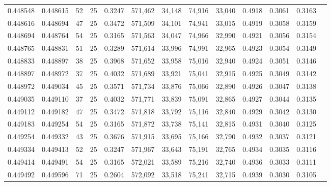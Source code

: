 \begin{tabular}{rrrrrrrrrrrrr}
0.448548 & 0.448615 &    52 &  25 &                                     0.3247 & 571,462 &  34,148 &  74,916 &  33,040 & 0.4918 & 0.3061 & 0.3163 \\
0.448616 & 0.448694 &    47 &  25 &                                     0.3472 & 571,509 &  34,101 &  74,941 &  33,015 & 0.4919 & 0.3058 & 0.3159 \\
0.448694 & 0.448764 &    54 &  25 &                                     0.3165 & 571,563 &  34,047 &  74,966 &  32,990 & 0.4921 & 0.3056 & 0.3154 \\
0.448765 & 0.448831 &    51 &  25 &                                     0.3289 & 571,614 &  33,996 &  74,991 &  32,965 & 0.4923 & 0.3054 & 0.3149 \\
0.448833 & 0.448897 &    38 &  25 &                                     0.3968 & 571,652 &  33,958 &  75,016 &  32,940 & 0.4924 & 0.3051 & 0.3146 \\
0.448897 & 0.448972 &    37 &  25 &                                     0.4032 & 571,689 &  33,921 &  75,041 &  32,915 & 0.4925 & 0.3049 & 0.3142 \\
0.448972 & 0.449034 &    45 &  25 &                                     0.3571 & 571,734 &  33,876 &  75,066 &  32,890 & 0.4926 & 0.3047 & 0.3138 \\
0.449035 & 0.449110 &    37 &  25 &                                     0.4032 & 571,771 &  33,839 &  75,091 &  32,865 & 0.4927 & 0.3044 & 0.3135 \\
0.449112 & 0.449182 &    47 &  25 &                                     0.3472 & 571,818 &  33,792 &  75,116 &  32,840 & 0.4929 & 0.3042 & 0.3130 \\
0.449183 & 0.449254 &    54 &  25 &                                     0.3165 & 571,872 &  33,738 &  75,141 &  32,815 & 0.4931 & 0.3040 & 0.3125 \\
0.449254 & 0.449332 &    43 &  25 &                                     0.3676 & 571,915 &  33,695 &  75,166 &  32,790 & 0.4932 & 0.3037 & 0.3121 \\
0.449334 & 0.449413 &    52 &  25 &                                     0.3247 & 571,967 &  33,643 &  75,191 &  32,765 & 0.4934 & 0.3035 & 0.3116 \\
0.449414 & 0.449491 &    54 &  25 &                                     0.3165 & 572,021 &  33,589 &  75,216 &  32,740 & 0.4936 & 0.3033 & 0.3111 \\
0.449492 & 0.449596 &    71 &  25 &                                     0.2604 & 572,092 &  33,518 &  75,241 &  32,715 & 0.4939 & 0.3030 & 0.3105 \\

\end{tabular}
